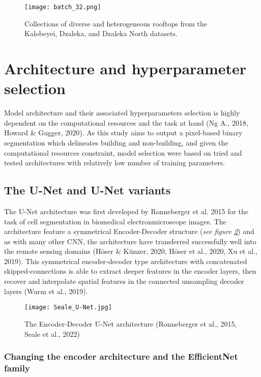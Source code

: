 \documentclass[11pt, a4paper, twoside]{report}
\begin{document}
\begin{figure}[H]
  \centering
  \texttt{[image: batch\_32.png]}
  \caption{Collections of diverse and heterogeneous rooftops from the Kalobeyei, Dzaleka, and Dzaleka North datasets.}
  \label{fig:rooftops}
\end{figure}

\section{Architecture and hyperparameter selection}\label{Arch&Hyperparam}

Model architecture and their associated hyperparameters selection is highly dependent on the computational resources and the task at hand (Ng A., 2018, Howard \& Gugger, 2020). As this study aims to output a pixel-based binary segmentation which delineates building and non-building, and given the computational resources constraint, model selection were based on tried and tested architectures with relatively low number of training parameters.\\\par

\subsection{The U-Net and U-Net variants}\label{Unet}

The U-Net architecture was first developed by Ronneberger et al. 2015 for the task of cell segmentation in biomedical electronmicroscope images. The architecture feature a symmetrical Encoder-Decoder structure (\textit{see figure \ref{fig:U-Net}}) and as with many other CNN, the architecture have transferred successfully well into the remote sensing domains (Höser \& Künzer, 2020, Höser et al., 2020, Xu et al., 2019). This symmetrical encoder-decoder type architecture with concatenated skipped-connections is able to extract deeper features in the encoder layers, then recover and interpolate spatial features in the connected unsampling decoder layers (Wurm et al., 2019).\\\par

\begin{figure}[H]
  \centering
  \texttt{[image: Seale\_U-Net.jpg]}
  \caption{The Encoder-Decoder U-Net architecture (Ronneberger et al., 2015, Seale et al., 2022)}
  \label{fig:U-Net}
\end{figure}

\subsubsection{Changing the encoder architecture and the EfficientNet family}\label{EffNet}
\end{document}
